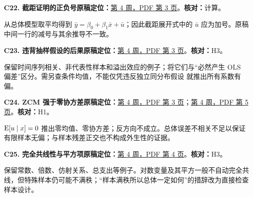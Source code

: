 \par\medskip\noindent\begin{minipage}{\linewidth}

\label{err:intercept-sign}

\textbf{C22. 截距证明的正负号}\quad\textbf{原稿定位：}\hyperref[src:w4p3]{第 4 周，PDF 第 3 页}。\quad\textbf{核对：}计算。\par

从总体模型取平均得到 $\bar y=\beta_0+\beta_1\bar x+\bar u$；因此截距展开式中的 $\bar u$ 应为加号。原稿中间一行的减号与其余推导不一致。

\end{minipage}\par

\par\medskip\noindent\begin{minipage}{\linewidth}

\label{err:violations}

\textbf{C23. 违背抽样假设的后果}\quad\textbf{原稿定位：}\hyperref[src:w4p3]{第 4 周，PDF 第 3 页}。\quad\textbf{核对：}H3。\par

保留时间序列相关、非代表性样本和溢出效应的例子；将它们与“必然产生 OLS 偏差”区分。需另查条件均值，不能仅凭违反独立同分布假设 就推出所有系数有偏。

\end{minipage}\par

\par\medskip\noindent\begin{minipage}{\linewidth}

\label{err:zcm-covariance}

\textbf{C24. ZCM 强于零协方差}\quad\textbf{原稿定位：}\hyperref[src:w4p3]{第 4 周，PDF 第 3 页}；\hyperref[src:w4p5]{第 4 周，PDF 第 5 页}。\quad\textbf{核对：}H1。\par

$\operatorname{E}[u\mid x]=0$ 推出零均值、零协方差；反方向不成立。总体误差不相关不足以保证有限样本无偏；与样本残差正交也不构成外生性的证据。

\end{minipage}\par

\par\medskip\noindent\begin{minipage}{\linewidth}

\label{err:collinearity}

\textbf{C25. 完全共线性与平方项}\quad\textbf{原稿定位：}\hyperref[src:w4p4]{第 4 周，PDF 第 4 页}。\quad\textbf{核对：}H3。\par

保留常数、倍数、仿射关系、总支出等例子。对数变量及其平方一般不自动完全共线，但特殊样本仍可能不满秩；“样本满秩所以总体一定如何”的措辞改为直接检查样本设计。

\end{minipage}\par


